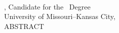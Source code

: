 \begin{center}
\vspace*{0.01in}
\large{\MakeUppercase{\MyThesisTitle}}\\
\vspace{24pt}
\normalsize{
  \MyName, Candidate for the \MyDegree\ Degree\\
  University of Missouri--Kansas City, \MyDegreeAwardYear\\
  \vspace{24pt}
  \MakeUppercase{Abstract}
  \vspace{12pt}
}
\end{center}

\doublespacing


\lipsum[1-2] %
